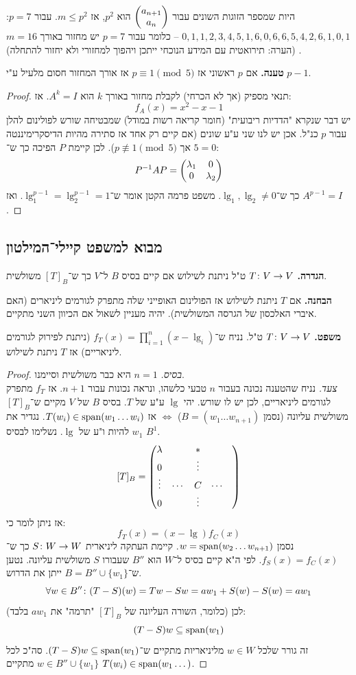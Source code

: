 \documentclass[]{../../../../tex/classes/styledArticle}
\begin{document}
	היות שמספר הזוגות השונים עבור $\begin{pmatrix} a_{n + 1} \\ a_n \end{pmatrix}$ הוא $p^2$, אז $m \le p^2$. עבור $p = 7$: \hfill $0, 1, 1, 2, 3, 4, 5, 1, 6, 0, 6, 6, 5, 4, 2, 6, 1, 0, 1$ – כלומר עבור $p = 7$ יש מחזור באורך $m = 16$. (הערה: תירואטית עם המידע הנוכחי ייתכן ויהפוך למחזורי ולא יחזור להתחלה)
	
	\textbf{טענה. }אם $p$ ראשוני אז $p \equiv 1 \pmod 5$ אז אורך המחזור חסום מלעיל ע"י $p - 1$. 
	
	\begin{proof}
		תנאי מספיק (אך לא הכרחי) לקבלת מחזור באורך $k$ הוא $A^k = I$. אז: 
		\[ f_A(x) = x^2 - x - 1 \]
		יש דבר שנקרא "הדדיות ריבועית" (חומר קריאה רשות במודל) שמבטיחה שורש לפולינום להלן עבור $p$ כנ"ל. אכן יש לנו שני ע"ע שונים (אם קיים רק אחד אז סתירה מהיות הדיסקרימיננטה $5 = 0$ אך $p \not\equiv 1 \pmod 5$). לכן קיימת $P$ הפיכה כך ש־: 
		\[ P^{-1} AP = \begin{pmatrix} \lambda_1 & 0 \\ 0 & \lambda_2 \end{pmatrix} \]
		כך ש־$\lg_1, \lg_2 \neq 0$. משפט פרמה הקטן אומר ש־$\lg_1^{p - 1}  = \lg_2^{p - 1} = 1$. ואז $A^{p - 1} = I$. 
	\end{proof}
	
	\subsection{מבוא למשפט קיילי־המילטון}
	\textbf{הגדרה. }$T \colon V \to V$ ט"ל ניתנת לשילוש אם קיים בסיס $B$ ל־$V$ כך ש־$[T]_B$ משולשית. 
	
	\textbf{הבחנה. }אם $T$ ניתנת לשילוש אז הפולינום האופייני שלה מתפרק לגורמים ליניארים (האם איברי האלכסון של הגרסה המשולשית). יהיה מעניין לשאול אם הכיוון השני מתקיים. 
	
	\textbf{משפט. }$T \colon V \to V$ ט"ל. נניח ש־$f_T(x) = \prod_{i = 1}^{n}(x - \lg_i)$ (ניתנת לפירוק לגורמים ליניאריים) אז $T$ ניתנת לשילוש. \begin{proof}
		\textit{בסיס. }$n = 1$ היא כבר משולשית וסיימנו. \\
		\textit{צעד. }נניח שהטענה נכונה בעבור $n$ טבעי כלשהו, ונראה נכונות עבור $n + 1$. אז $f_T$ מתפרק לגורמים ליניאריים, לכן יש לו שורש. יהי $\lg$ ע"ע של $T$. בסיס $B$ של $V$ מקיים ש־$[T]_B$ משולשית עליונה (נסמן $B = (w_1 \dots w_{n + 1})$) $\iff$ אז $T(w_i) \in \operatorname{span}(w_1 \dots w_i)$. נגדיר את $w_1$ להיות ו"ע של $\lg$. נשלימו לבסיס $B^1$. 
		\[ [T]_B = \begin{pmatrix} \lambda & & * && \\ 0 && \vdots \\ \vdots &\cdots & C & \cdots \\ 0 & &\vdots  \end{pmatrix} \]
		אז ניתן לומר כי: 
		\[ f_T(x) = (x - \lg) f_C(x) \]
		נסמן $w = \operatorname{span}(w_2 \dots w_{n + 1})$. קיימת העתקה ליניארית $S \colon W \to W$ כך ש־$f_S(x) = f_C(x)$. לפי ה"א קיים בסיס ל־$W$ הוא $B''$ שעבורו $S$ משולשית עליונה. נטען ש־$B = B'' \cup \{w_1\}$ ייתן את הדרוש. 
		\[ \forall w \in B'' \colon (T - S)(w) = Tw - Sw = aw_1 + S(w) - S(w) = aw_1 \]
		(כלומר, השורה העליונה של $[T]_B$ "תרמה" את $aw_1$ בלבד)
		לכן: 
		\[ (T - S)w \subseteq \operatorname{span}(w_1) \]
		זה גורר שלכל $w \in W$ מליניאריות מתקיים ש־$(T - S)w \subseteq \operatorname{span}(w_1)$. סה"כ לכל $w \in B'' \cup \{w_1\}$ מתקיים $T(w_i) \in \operatorname{span}(w_1 \dots)$. 
	\end{proof}
	
\end{document}
